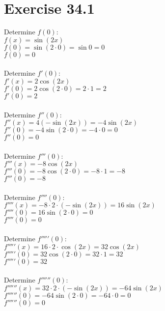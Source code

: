 \documentclass[a4paper, 10pt]{scrartcl}
\begin{document}
\section{Exercise 34.1}

Determine $f(0)$:\\
$f(x) = \sin{(2x)}$\\
$f(0) = \sin{(2 \cdot 0)} = \sin{0} = 0$\\
$f(0) = 0$\\
\\
Determine $f'(0)$:\\
$f'(x) = 2 \cos{(2x)}$\\
$f'(0) = 2 \cos{(2 \cdot 0)} = 2 \cdot 1 = 2$\\
$f'(0) = 2$\\
\\
Determine $f''(0)$:\\
$f''(x) = 4 (- \sin{(2x)}) = -4 \sin{(2x)}$\\
$f''(0) = -4 \sin{(2 \cdot 0)} = -4 \cdot 0 = 0$\\
$f''(0) = 0$\\
\\
Determine $f'''(0)$:\\
$f'''(x) = -8 \cos{(2x)}$\\
$f'''(0) = -8 \cos{(2 \cdot 0)} = -8 \cdot 1 = -8$\\
$f'''(0) = -8$\\
\\
Determine $f''''(0)$:\\
$f''''(x) = -8 \cdot 2 \cdot (- \sin{(2x)}) = 16 \sin{(2x)}$\\
$f''''(0) = 16 \sin{(2 \cdot 0)} = 0$\\
$f''''(0) = 0$\\
\\
Determine $f'''''(0)$:\\
$f'''''(x) = 16 \cdot 2 \cdot \cos{(2x)} = 32 \cos{(2x)}$\\
$f'''''(0) = 32 \cos{(2 \cdot 0)} = 32 \cdot 1 = 32$\\
$f'''''(0) = 32$\\
\\
Determine $f''''''(0)$:\\
$f''''''(x) = 32 \cdot 2 \cdot (- \sin{(2x)}) = -64 \sin{(2x)}$\\
$f''''''(0) = -64 \sin{(2 \cdot 0)} = -64 \cdot 0 = 0$\\
$f''''''(0) = 0$\\
\end{document}
